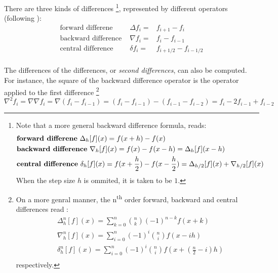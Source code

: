 There are three kinds of differences \footnote{Note that a more general backward difference formula, 
reads:
\begin{equation}
  \begin{aligned}
    & \text{\textbf{forward differene} } {\Delta}_h [f](x) = f(x+h) - f(x)\\  
    & \text{\textbf{backward difference} } {\nabla}_h [f](x) = f(x) - f(x-h) = {\Delta}_h [f](x-h)\\
    & \text{\textbf{central difference} } {\delta}_h [f](x) = f(x+\frac{h}{2}) - f(x-\frac{h}{2}) = {\Delta}_{h/2} [f](x) + {\nabla}_{h/2} [f](x)\\
  \end{aligned}
\end{equation}
When the step size \( h \) is ommited, it is taken to be \(1\). }, 
represented by different operators (following \cite{berry2004}):
\begin{equation}
  \begin{aligned}
    \text{forward differene     } &   \Delta f_i    = & f_{i+1} - f_i \\
    \text{backward difference    } & \nabla f_i  = & f_i - f_{i-1} \\
    \text{central difference    } &   \delta f_i   = & f_{i+1/2} - f_{i-1/2} \\
  \end{aligned}
\end{equation}

The differences of the
differences, or \emph{second differences}, can also be computed. For instance,
the square of the backward difference operator is the operator applied to the first
difference \footnote{
  On a more genral manner, the n\textsuperscript{th} order forward, backward and central differences read :
\begin{equation}
  \begin{aligned}
  & {\Delta}^n_h [f](x) = \sum_{k=0}^n \binom{n}{k} (-1)^{n-k} f(x+k)\\
  & {\nabla}^n_h [f](x) = \sum_{i=0}^n (-1)^i \binom{n}{i} f(x-ih)\\
  & {\delta}^n_h [f](x) = \sum_{i=0}^n (-1)^i \binom{n}{i} f(x + (\frac{n}{2} -i)h)\\
  \end{aligned}
\end{equation}
respectively.}
\begin{equation}
  {\nabla}^2 f_i = \nabla \nabla f_i = \nabla (f_i - f_{i-1}) = 
  (f_i - f_{i-1}) - (f_{i-1} - f_{i-2}) = f_i - 2 f_{i-1} + f_{i-2}
\end{equation}

